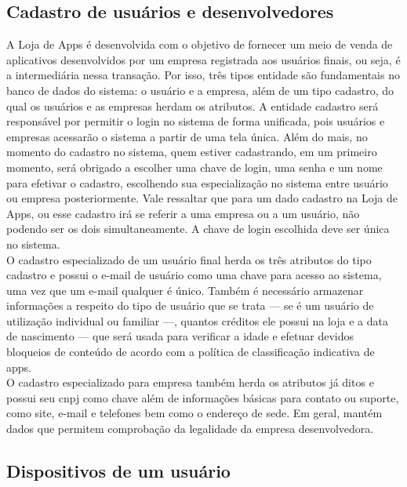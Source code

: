 \vspace{2mm}



\subsection{Cadastro de usuários e desenvolvedores}


A Loja de Apps é desenvolvida com o objetivo de fornecer um meio de venda de aplicativos desenvolvidos por um empresa registrada aos usuários finais, ou seja, é a intermediária nessa transação. Por isso, três tipos entidade são fundamentais no banco de dados do sistema: o usuário e a empresa, além de um tipo cadastro, do qual os usuários e as empresas herdam os atributos. A entidade cadastro será responsável por permitir o login no sistema de forma unificada, pois usuários e empresas acessarão o sistema a partir de uma tela única. Além do mais, no momento do cadastro no sistema, quem estiver cadastrando, em um primeiro momento, será obrigado a escolher uma chave de login, uma senha e um nome para efetivar o cadastro, escolhendo sua especialização no sistema entre usuário ou empresa posteriormente. Vale ressaltar que para um dado cadastro na Loja de Apps, ou esse cadastro irá se referir a uma empresa ou a um usuário, não podendo ser os dois simultaneamente. A chave de login escolhida deve ser única no sistema.\\

O cadastro especializado de um usuário final herda os três atributos do tipo cadastro e possui o e-mail de usuário como uma chave para acesso ao sistema, uma vez que um e-mail qualquer é único. Também é necessário armazenar informações a respeito do tipo de usuário que se trata --- se é um usuário de utilização individual ou familiar ---, quantos créditos ele possui na loja e a data de nascimento --- que será usada para verificar a idade e efetuar devidos bloqueios de conteúdo de acordo com a política de classificação indicativa de apps.\\

O cadastro especializado para empresa também herda os atributos já ditos e possui seu cnpj como chave além de informações básicas para contato ou suporte, como site, e-mail e telefones bem como o endereço de sede. Em geral, mantém dados que permitem comprobação da legalidade da empresa desenvolvedora.\\



\subsection{Dispositivos de um usuário}


